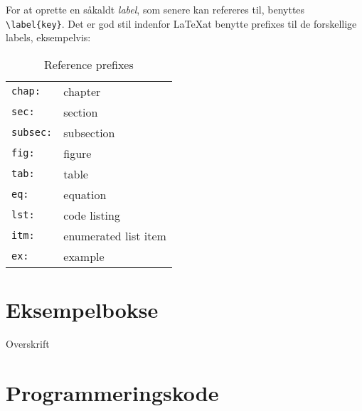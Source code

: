 For at oprette en såkaldt \emph{label}, som senere kan refereres til, benyttes \verb|\label{key}|. Det er god
stil indenfor \LaTeX at benytte prefixes til de forskellige labels, eksempelvis:
\begin{table}[h]
  \begin{center}
    \begin{tabular}{ll}
      \toprule[1.5pt]
      \texttt{chap:}   & chapter              \\ 
      \texttt{sec:}    & section              \\ 
      \texttt{subsec:} & subsection           \\ 
      \texttt{fig:}    & figure               \\ 
      \texttt{tab:}    & table                \\ 
      \texttt{eq:}     & equation             \\ 
      \texttt{lst:}    & code listing         \\ 
      \texttt{itm:}    & enumerated list item \\ 
      \texttt{ex:}     & example              \\
      \bottomrule[1.5pt]
    \end{tabular}
  \end{center}
  \caption{Reference prefixes} \label{tab:reference_prefixes}
\end{table}


\section{Eksempelbokse}

\begin{example}{Overskrift}
  \label{ex:an_example}
  \lipsum[1]
\end{example}



\section{Programmeringskode}

